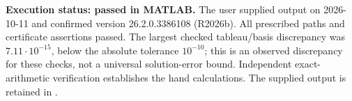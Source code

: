\documentclass[11pt,a4paper]{article}
\begin{document}
\textbf{Execution status: passed in MATLAB.}
The user supplied output on 2026-10-11 and confirmed version
26.2.0.3386108 (R2026b). All prescribed paths and certificate assertions passed.
The largest checked tableau/basis discrepancy was $7.11\cdot10^{-15}$,
below the absolute tolerance $10^{-10}$; this is an observed discrepancy for
these checks, not a universal solution-error bound.
Independent exact-arithmetic verification establishes the hand calculations.
The supplied output is retained in .
\end{document}
